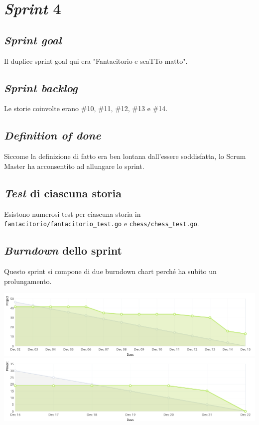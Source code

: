 \documentclass{article}
\begin{document}
\section{\emph{Sprint} 4}

\subsection{\emph{Sprint goal}}

Il duplice sprint goal qui era "Fantacitorio e scaTTo matto".

\subsection{\emph{Sprint backlog}}

Le storie coinvolte erano \#10, \#11, \#12, \#13 e \#14.

\subsection{\emph{Definition of done}}

Siccome la definizione di fatto era ben lontana dall'essere soddisfatta, lo
Scrum Master ha acconsentito ad allungare lo sprint.

\subsection{\emph{Test} di ciascuna storia}

Esistono numerosi test per ciascuna storia in
\verb!fantacitorio/fantacitorio_test.go! e \verb!chess/chess_test.go!.

\subsection{\emph{Burndown} dello sprint}

Questo sprint si compone di due burndown chart perché ha subito un
prolungamento.

\includegraphics[width=\textwidth]{burndown-4-0}
\includegraphics[width=\textwidth]{burndown-4-1}
\end{document}
